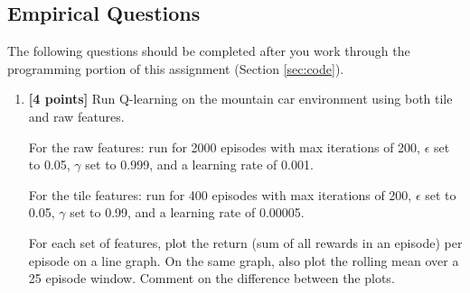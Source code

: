 \subsection{Empirical Questions }

The following questions should be completed after you work through the programming portion of this assignment (Section \ref{sec:code}). 

\begin{enumerate}
\item \textbf{[4 points]} Run Q-learning on the mountain car environment using both tile and raw features. 

For the raw features: run for 2000 episodes with max iterations of 200, $\epsilon$ set to 0.05, $\gamma$ set to 0.999, and a learning rate of 0.001. 

For the tile features: run for 400 episodes with max iterations of 200, $\epsilon$ set to 0.05, $\gamma$ set to 0.99, and a learning rate of 0.00005.

For each set of features, plot the return (sum of all rewards in an episode) per episode on a line graph. On the same graph, also plot the rolling mean over a 25 episode window. Comment on the difference between the plots.

\begin{tcolorbox}[fit,height=12cm, width=\linewidth, blank, borderline={1pt}{-2pt},nobeforeafter]
\end{tcolorbox}

\end{enumerate}

